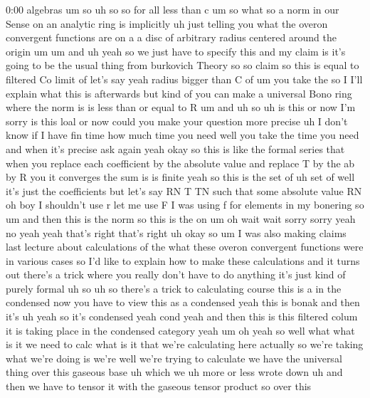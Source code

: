 \begin{unfinished}{0:00}
algebras  um
so
uh
so  so  for
all  less  than
c  um  so  what  so  a  norm  in  our  Sense  on
an  analytic  ring  is  implicitly  uh  just
telling  you  what  the  overon  convergent
functions  are  on  a  a  disc  of  arbitrary
radius  centered  around  the  origin
um  um  and  uh  yeah  so  we  just  have  to
specify  this  and  my  claim  is  it's  going
to  be  the  usual  thing  from  burkovich
Theory  so  so
claim  so  this  is  equal  to  filtered  Co
limit  of  let's  say  yeah  radius  bigger
than  C  of  um  you  take  the  so  I  I'll
explain  what  this  is  afterwards  but  kind
of  you  can  make  a  universal  Bono  ring
where  the  norm  is  is  less  than  or  equal
to
R
um  and  uh
so  uh  is  this  or  now  I'm  sorry  is  this
loal  or
now  could  you  make  your  question  more
precise  uh  I  don't  know  if  I  have  fin
time  how  much  time  you
need  well  you  take  the  time  you  need  and
when  it's  precise  ask  again
yeah
okay  so  this  is
like  the  formal  series  that  when  you
replace  each  coefficient  by  the  absolute
value  and  replace  T  by  the  ab  by  R  you
it  converges  the  sum  is  is  finite  yeah
so  this  is  the  set  of  uh  set  of  well
it's  just  the  coefficients  but  let's  say
RN  T  TN  such  that  some  absolute  value  RN
oh  boy  I  shouldn't  use  r  let  me  use  F  I
was  using  f  for  elements  in  my  bonering
so
um  and  then  this  is  the  norm  so  this  is
the
on  um  oh  wait  wait  sorry  sorry  yeah  no
yeah  yeah  that's  right  that's
right  uh
okay  so  um  I  was  also  making  claims  last
lecture  about  calculations  of  the  what
these  overon  convergent  functions  were
in  various  cases  so  I'd  like  to  explain
how  to  make  these  calculations  and  it
turns  out  there's  a  trick  where  you
really  don't  have  to  do  anything  it's
just  kind  of  purely  formal  uh  so
uh  so  there's  a  trick  to
calculating  course  this  is  a  in  the
condensed  now  you  have  to  view  this  as  a
condensed
yeah  this  is  bonak  and  then  it's  uh  yeah
so  it's  condensed  yeah  cond  yeah  and
then  this  is  this  filtered  colum  it  is
taking  place  in  the  condensed  category
yeah  um  oh  yeah  so  well  what  what  is  it
we  need  to  calc  what  is  it  that  we're
calculating  here  actually  so  we're
taking  what  we're  doing  is  we're  well
we're  trying  to  calculate  we  have  the
universal  thing  over  this  gaseous
base
uh  which
we  uh  more  or  less  wrote  down  uh
and  then  we  have  to  tensor  it  with  the
gaseous  tensor  product  so  over  this

\end{unfinished}
